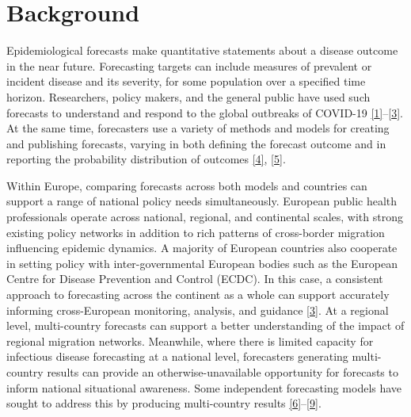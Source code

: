 \documentclass[
]{article}
\begin{document}
\hypertarget{background}{%
\section{Background}\label{background}}

Epidemiological forecasts make quantitative statements about a disease outcome in the near future. Forecasting targets can include measures of prevalent or incident disease and its severity, for some population over a specified time horizon. Researchers, policy makers, and the general public have used such forecasts to understand and respond to the global outbreaks of COVID-19 \protect\hyperlink{ref-basshuysenThreeWaysWhich2021}{{[}1{]}}--\protect\hyperlink{ref-europeancentrefordiseasepreventionandcontrolForecastingCOVID19Cases2021}{{[}3{]}}. At the same time, forecasters use a variety of methods and models for creating and publishing forecasts, varying in both defining the forecast outcome and in reporting the probability distribution of outcomes \protect\hyperlink{ref-zelnerAccountingUncertaintyPandemic2021}{{[}4{]}}, \protect\hyperlink{ref-jamesUseMisuseMathematical2021}{{[}5{]}}.

Within Europe, comparing forecasts across both models and countries can support a range of national policy needs simultaneously. European public health professionals operate across national, regional, and continental scales, with strong existing policy networks in addition to rich patterns of cross-border migration influencing epidemic dynamics. A majority of European countries also cooperate in setting policy with inter-governmental European bodies such as the European Centre for Disease Prevention and Control (ECDC). In this case, a consistent approach to forecasting across the continent as a whole can support accurately informing cross-European monitoring, analysis, and guidance \protect\hyperlink{ref-europeancentrefordiseasepreventionandcontrolForecastingCOVID19Cases2021}{{[}3{]}}. At a regional level, multi-country forecasts can support a better understanding of the impact of regional migration networks. Meanwhile, where there is limited capacity for infectious disease forecasting at a national level, forecasters generating multi-country results can provide an otherwise-unavailable opportunity for forecasts to inform national situational awareness. Some independent forecasting models have sought to address this by producing multi-country results \protect\hyperlink{ref-aguasModellingCOVID19Pandemic2020}{{[}6{]}}--\protect\hyperlink{ref-agostoMonitoringCOVID19Contagion2021}{{[}9{]}}.
\end{document}

